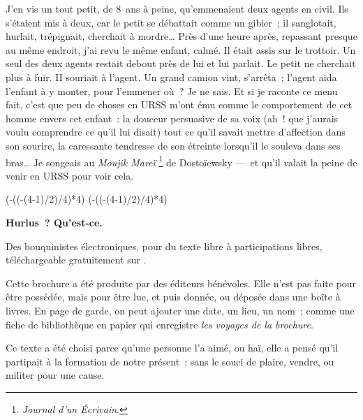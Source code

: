 \documentclass[french,twoside]{book} %
\newcommand\chapterclose{} %
\def\truncdiv#1#2{((#1-(#2-1)/2)/#2)}
\def\moduloop#1#2{(#1-\truncdiv{#1}{#2}*#2)}
\def\modulo#1#2{\number\numexpr\moduloop{#1}{#2}\relax}
\begin{document}
J’en vis un tout petit, de 8 ans à peine, qu’emmenaient deux agents en civil. Ils s’étaient mis à deux, car le petit se débattait comme un gibier ; il sanglotait, hurlait, trépignait, cherchait à mordre… Près d’une heure après, repassant presque au même endroit, j’ai revu le même enfant, calmé. Il était assis sur le trottoir. Un seul des deux agents restait debout près de lui et lui parlait. Le petit ne cherchait plus à fuir. II souriait à l’agent. Un grand camion vint, s’arrêta ; l’agent aida l’enfant à y monter, pour l’emmener où ? Je ne sais. Et si je raconte ce menu fait, c’est que peu de choses en URSS m’ont ému comme le comportement de cet homme envers cet enfant : la douceur persuasive de sa voix (ah ! que j’aurais voulu comprendre ce qu’il lui disait) tout ce qu’il savait mettre d’affection dans son sourire, la caressante tendresse de son étreinte lorsqu’il le souleva dans ses bras… Je songeais au \emph{Moujik Mareï} \footnote{\emph{Journal d’un Écrivain}.} de Dostoïewsky — et qu’il valait la peine de venir en URSS pour voir cela.
\chapterclose

 


\ifbooklet
  \pagestyle{empty}
  \clearpage
  \ifnum\modulo{\value{page}}{4}=0 \hbox{}\newpage\hbox{}\newpage\fi
  \ifnum\modulo{\value{page}}{4}=1 \hbox{}\newpage\hbox{}\newpage\fi


  \hbox{}\newpage
  \ifodd\value{page}\hbox{}\newpage\fi
  {\centering\color{rubric}\bfseries\noindent\large
    Hurlus ? Qu’est-ce.\par
    \bigskip
  }
  \noindent Des bouquinistes électroniques, pour du texte libre à participations libres,
  téléchargeable gratuitement sur \href{https://hurlus.fr}{}.\par
  \bigskip
  \noindent Cette brochure a été produite par des éditeurs bénévoles.
  Elle n’est pas faite pour être possédée, mais pour être lue, et puis donnée, ou déposée dans une boîte à livres.
  En page de garde, on peut ajouter une date, un lieu, un nom ;
  comme une fiche de bibliothèque en papier qui enregistre \emph{les voyages de la brochure}.
  \par

  Ce texte a été choisi parce qu’une personne l’a aimé,
  ou haï, elle a pensé qu’il partipait à la formation de notre présent ;
  sans le souci de plaire, vendre, ou militer pour une cause.
  \par
\end{document}
